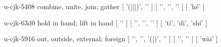 \begin{multicols}{2}
\lettrine[lines=3]{\cjkgGlue{}}{}\begin{minipage}{0.8\linewidth} u-cjk-5408  combine, unite, join; gather  [ '\cjkgGlue{}(\cjkgGlue{}|\cjkgGlue{}|\cjkgGlue{}|\cjkgGlue{})', '\cjkgGlue{}' ]  [ '\cjkgGlue{}', '\cjkgGlue{}', '\cjkgGlue{}' ]  [ 'hé' ] \end{minipage}

\lettrine[lines=3]{\cjkgGlue{}}{}\begin{minipage}{0.8\linewidth} u-cjk-63d0  hold in hand; lift in hand  [ '\cjkgGlue{}' ]  [ '\cjkgGlue{}', '\cjkgGlue{}', '\cjkgGlue{}' ]  [ 'tí', 'dī', 'shí' ] \end{minipage}

\lettrine[lines=3]{\cjkgGlue{}}{}\begin{minipage}{0.8\linewidth} u-cjk-5916  out, outside, external; foreign  [ '\cjkgGlue{}', '\cjkgGlue{}', '\cjkgGlue{}(\cjkgGlue{}|\cjkgGlue{})', '\cjkgGlue{}' ]  [ '\cjkgGlue{}', '\cjkgGlue{}' ]  [ 'wài' ] \end{minipage}


\end{multicols}

